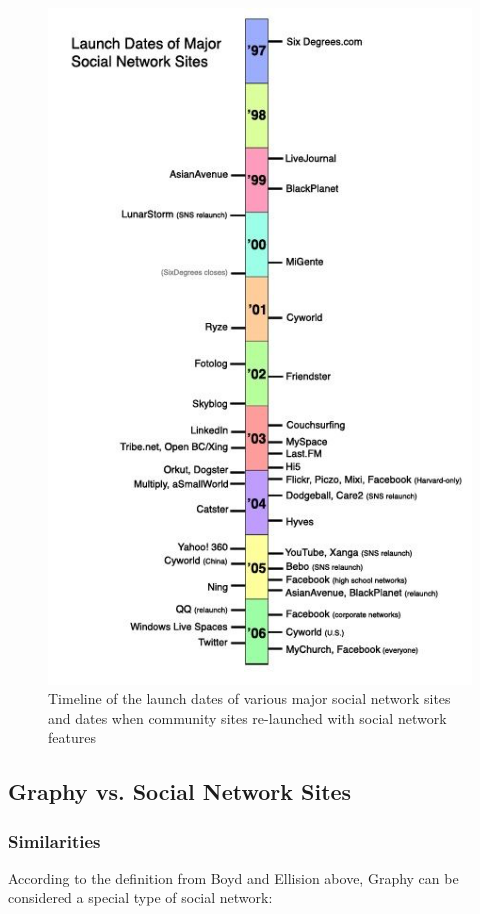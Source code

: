 \begin{figure}[p]
\begin{centering}
\includegraphics[scale=0.8]{pics/social_network_history}
\caption{Timeline of the launch dates of various major social network sites and dates when community sites re-launched with social network features}\label{fig:social_network_history}
\end{centering}
\end{figure}

\subsection{Graphy vs. Social Network Sites}
\subsubsection{Similarities}
According to the definition from Boyd and Ellision above, Graphy can be considered a special type of social network:

